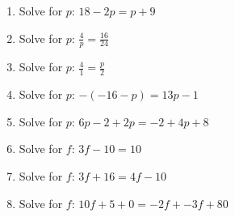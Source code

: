 \begin{enumerate}[noitemsep, label=\textbf{\arabic*}. ]
\label{m39241*uid21}\item Solve for \begin{math}p\end{math}: \begin{math}18-2p=p+9\end{math}\hspace{1ex}        
\label{m39241*uid22}\item Solve for \begin{math}p\end{math}: \begin{math}\frac{4}{p}=\frac{16}{24}\end{math}\hspace{1ex}        
\label{m39241*uid23}\item Solve for \begin{math}p\end{math}: \begin{math}\frac{4}{1}=\frac{p}{2}\end{math}\hspace{1ex}        
\label{m39241*uid24}\item Solve for \begin{math}p\end{math}: \begin{math}-\left(-16-p\right)=13p-1\end{math}\hspace{1ex}        
\label{m39241*uid25}\item Solve for \begin{math}p\end{math}: \begin{math}6p-2+2p=-2+4p+8\end{math}\hspace{1ex}        
\label{m39241*uid26}\item Solve for \begin{math}f\end{math}: \begin{math}3f-10=10\end{math}\hspace{1ex}        
\label{m39241*uid27}\item Solve for \begin{math}f\end{math}: \begin{math}3f+16=4f-10\end{math}\hspace{1ex}        
\label{m39241*uid28}\item Solve for \begin{math}f\end{math}: \begin{math}10f+5+0=-2f+-3f+80\end{math}\hspace{1ex}        

\end{enumerate}
